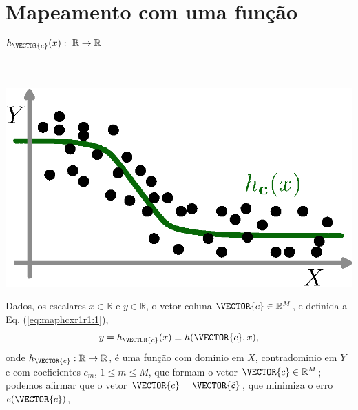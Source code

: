 \section{ Mapeamento com uma função $h_{\VECTOR{c}}(x):~\mathbb{R} \rightarrow \mathbb{R}$ }


\begin{theorem}
\label{theo:maphcxr1r1}
~\\
\begin{minipage}{0.4\textwidth}
\centering
\includegraphics[width=0.95\linewidth]{chapters/mapeamento/mapeamento-hx-nonlinear.eps} 
\end{minipage}
\begin{minipage}{0.6\textwidth}
Dados,
os escalares $x \in \mathbb{R}$ e $y \in \mathbb{R}$, o vetor coluna $\VECTOR{c} \in \mathbb{R}^M$, e 
definida a Eq. (\ref{eq:maphcxr1r1:1}), 
\begin{equation}\label{eq:maphcxr1r1:1}
y=h_{\VECTOR{c}}(x)\equiv h(\VECTOR{c},x),
\end{equation}
onde $h_{\VECTOR{c}}:\mathbb{R} \rightarrow \mathbb{R}$, é uma função com dominio em $X$, contradominio em $Y$
e com coeficientes $c_m$, $1 \leq m \leq M$, que formam o vetor $\VECTOR{c} \in \mathbb{R}^{M}$;
podemos afirmar que o vetor $\VECTOR{c}=\VECTOR{\hat{c}}$,
que minimiza o erro $e(\VECTOR{c})$,
\end{minipage}


\end{theorem}

